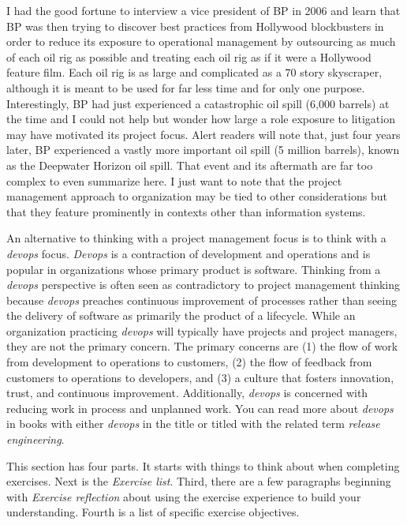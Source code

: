 I had the good fortune to interview a vice president of BP in 2006 and
learn that BP was then trying to discover best practices from Hollywood
blockbusters in order to reduce its exposure to operational management
by outsourcing as much of each oil rig as possible and treating each oil
rig as if it were a Hollywood feature film. Each oil rig is as large and
complicated as a 70 story skyscraper, although it is meant to be used
for far less time and for only one purpose. Interestingly, BP had just
experienced a catastrophic oil spill (6,000 barrels) at the time and I
could not help but wonder how large a role exposure to litigation may
have motivated its project focus. Alert readers will note that, just
four years later, BP experienced a vastly more important oil spill (5
million barrels), known as the Deepwater Horizon oil spill. That event
and its aftermath are far too complex to even summarize here. I just
want to note that the project management approach to organization may be
tied to other considerations but that they feature prominently in
contexts other than information systems.

An alternative to thinking with a project management focus is to think
with a \emph{devops} focus. \emph{Devops} is a contraction of
development and operations and is popular in organizations whose primary
product is software. Thinking from a \emph{devops} perspective is often
seen as contradictory to project management thinking because
\emph{devops} preaches continuous improvement of processes rather than
seeing the delivery of software as primarily the product of a lifecycle.
While an organization practicing \emph{devops} will typically have
projects and project managers, they are not the primary concern. The
primary concerns are (1) the flow of work from development to operations
to customers, (2) the flow of feedback from customers to operations to
developers, and (3) a culture that fosters innovation, trust, and
continuous improvement. Additionally, \emph{devops} is concerned with
reducing work in process and unplanned work. You can read more about
\emph{devops} in books with either \emph{devops} in the title or titled
with the related term \emph{release engineering}.

\hypertarget{exercises}{%
\label{exercises}}

This section has four parts. It starts with things to think about when
completing exercises. Next is the \emph{Exercise list}. Third, there are
a few paragraphs beginning with \emph{Exercise reflection} about using
the exercise experience to build your understanding. Fourth is a list of
specific exercise objectives.

